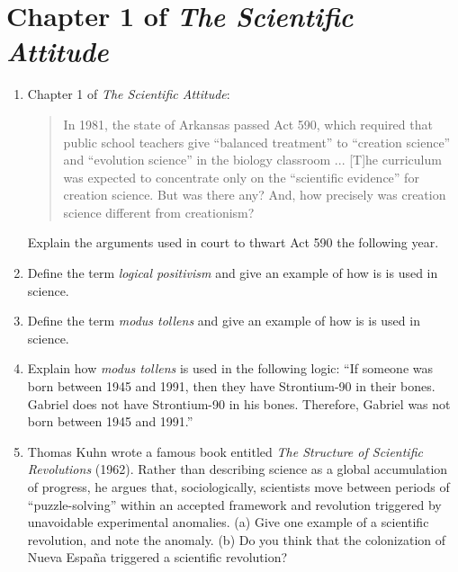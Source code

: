 \documentclass[12pt]{article}
\begin{document}
\maketitle

\section{Chapter 1 of \textit{The Scientific Attitude}}

\begin{enumerate}
\item Chapter 1 of \textit{The Scientific Attitude}:
\begin{quotation}
In 1981, the state of Arkansas passed Act 590, which required that public school teachers give ``balanced treatment'' to ``creation science'' and ``evolution science'' in the biology classroom ... [T]he curriculum was expected to concentrate only on the ``scientific evidence'' for creation science.  But was there any?  And, how precisely was creation science different from creationism?
\end{quotation}
Explain the arguments used in court to thwart Act 590 the following year. \\ \vspace{0.75cm}
\item Define the term \textit{logical positivism} and give an example of how is is used in science. \\ \vspace{0.5cm}
\item Define the term \textit{modus tollens} and give an example of how is is used in science. \\ \vspace{0.5cm}
\item Explain how \textit{modus tollens} is used in the following logic: ``If someone was born between 1945 and 1991, then they have Strontium-90 in their bones.  Gabriel does not have Strontium-90 in his bones.  Therefore, Gabriel was not born between 1945 and 1991.''  \\ \vspace{0.5cm}
\item Thomas Kuhn wrote a famous book entitled \textit{The Structure of Scientific Revolutions} (1962).  Rather than describing science as a global accumulation of progress, he argues that, sociologically, scientists move between periods of ``puzzle-solving'' within an accepted framework and revolution triggered by unavoidable experimental anomalies. (a) Give one example of a scientific revolution, and note the anomaly. (b) Do you think that the colonization of Nueva Espa\~{n}a triggered a scientific revolution?
\end{enumerate}
\end{document}
